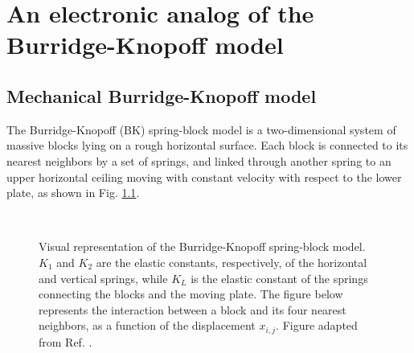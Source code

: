 \chapter{An electronic analog of the Burridge-Knopoff model}
\label{chap: electronic analog of bk}

\section{Mechanical Burridge-Knopoff model}
\label{sec: mechanical bk}

The Burridge-Knopoff (BK) spring-block model \cite{ref:bk} is a two-dimensional system of massive blocks
lying on a rough horizontal surface. Each block is connected to its nearest neighbors by a set of springs,
and linked through another spring to an upper horizontal ceiling moving with constant velocity with respect to the lower plate,
as shown in Fig. \ref{fig bk}.

\begin{figure}[H]
    \centering
    \\[0.43cm]
    \caption{Visual representation of the Burridge-Knopoff spring-block model. $K_1$ and $K_2$
    are the elastic constants, respectively, of the horizontal and vertical springs, while $K_L$
    is the elastic constant of the springs connecting the blocks and the moving plate.
    The figure below represents the interaction between a block and its four nearest neighbors,
    as a function of the displacement $x_{i,j}$. Figure adapted from Ref. \cite{ref:ofc}.}
    \label{fig bk}
\end{figure}

